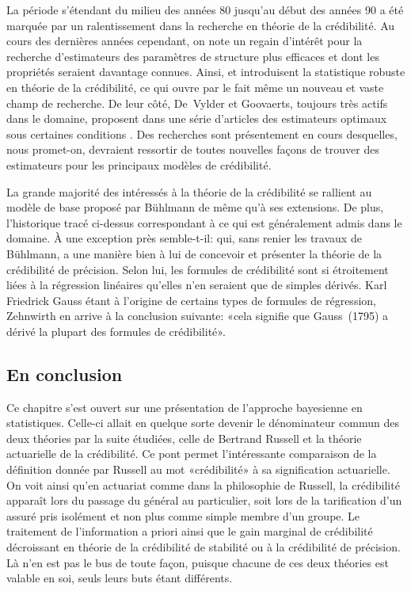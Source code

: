 La période s'étendant du milieu des années 80 jusqu'au début des
années 90 a été marquée par un ralentissement dans la recherche en
théorie de la crédibilité. Au cours des dernières années cependant, on
note un regain d'intérêt pour la recherche d'estimateurs des
paramètres de structure plus efficaces et dont les propriétés seraient
davantage connues. Ainsi, \cite{Kunsch:robust:1992} et
\cite{Gisler:robust:1993} introduisent la statistique robuste en
théorie de la crédibilité, ce qui ouvre par le fait même un nouveau et
vaste champ de recherche. De leur côté, De~Vylder et Goovaerts,
toujours très actifs dans le domaine, proposent dans une série
d'articles des estimateurs optimaux sous certaines conditions
\citep{DeVylder:zeroexcess:summary:1991,%
  DeVylder:zeroexcess:classical:1992,%
  DeVylder:zeroexcess:BS:1992}. Des recherches sont présentement en
cours desquelles, nous promet-on, devraient ressortir de toutes
nouvelles façons de trouver des estimateurs pour les principaux
modèles de crédibilité.

La grande majorité des intéressés à la théorie de la crédibilité se
rallient au modèle de base proposé par Bühlmann de même qu'à ses
extensions. De plus, l'historique tracé ci-dessus correspondant à ce
qui est généralement admis dans le domaine. À une exception près
semble-t-il: \cite{Zehnwirth:studyguide:1991} qui, sans renier les
travaux de Bühlmann, a une manière bien à lui de concevoir et
présenter la théorie de la crédibilité de précision. Selon lui, les
formules de crédibilité sont si étroitement liées à la régression
linéaires qu'elles n'en seraient que de simples dérivés. Karl
Friedrick Gauss étant à l'origine de certains types de formules de
régression, Zehnwirth en arrive à la conclusion suivante: «cela
signifie que Gauss~(1795) a dérivé la plupart des formules de
crédibilité».

\subsection{En conclusion}

Ce chapitre s'est ouvert sur une présentation de l'approche bayesienne
en statistiques. Celle-ci allait en quelque sorte devenir le
dénominateur commun des deux théories par la suite étudiées, celle de
Bertrand Russell et la théorie actuarielle de la crédibilité. Ce pont
permet l'intéressante comparaison de la définition donnée par Russell
au mot «crédibilité» à sa signification actuarielle. On voit ainsi
qu'en actuariat comme dans la philosophie de Russell, la crédibilité
apparaît lors du passage du général au particulier, soit lors de la
tarification d'un assuré pris isolément et non plus comme simple
membre d'un groupe. Le traitement de l'information a priori ainsi que
le gain marginal de crédibilité décroissant en théorie de la
crédibilité de stabilité ou à la crédibilité de précision. Là n'en est
pas le bus de toute façon, puisque chacune de ces deux théories est
valable en soi, seuls leurs buts étant différents.

